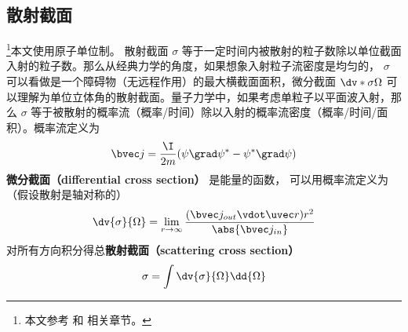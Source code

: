 

\subsection{散射截面}

\footnote{本文参考 \cite{Bransden} 和 \cite{Burke} 相关章节。}本文使用原子单位制。 散射截面 $\sigma$ 等于一定时间内被散射的粒子数除以单位截面入射的粒子数。那么从经典力学的角度，如果想象入射粒子流密度是均匀的， $\sigma$ 可以看做是一个障碍物（无远程作用）的最大横截面面积，微分截面 $\dv*{\sigma}{\Omega}$ 可以理解为单位立体角的散射截面。量子力学中，如果考虑单粒子以平面波入射，那么 $\sigma$ 等于被散射的概率流（概率/时间）除以入射的概率流密度（概率/时间/面积）。概率流定义为
\begin{equation}
\bvec j = \frac{\I }{2m}(\psi \grad \psi^* - \psi^* \grad \psi )
\end{equation}
\textbf{微分截面（differential cross section）} 是能量的函数， 可以用概率流定义为（假设散射是轴对称的）
\begin{equation}\label{eq_ParWav_3}
\dv{\sigma}{\Omega} = \lim_{r\to\infty} \frac{(\bvec j_{out} \vdot \uvec r) r^2}{\abs{\bvec j_{in}}}
\end{equation}
对所有方向积分得总\textbf{散射截面（scattering cross section）}
\begin{equation}
\sigma = \int \dv{\sigma}{\Omega} \dd{\Omega} 
\end{equation}

